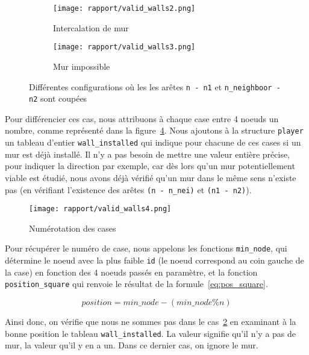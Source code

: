 \documentclass[a4paper]{article}
\begin{document}
\begin{figure}[ht]
    \centering
    \begin{subfigure}{.5\textwidth}
        \centering
        \texttt{[image: rapport/valid\_walls2.png]}
        \caption{Intercalation de mur}
        \label{fig:valid_walls2}
    \end{subfigure}%
    \begin{subfigure}{.5\textwidth}
        \centering
        \texttt{[image: rapport/valid\_walls3.png]}
        \caption{Mur impossible}
        \label{fig:valid_walls3}
    \end{subfigure}
    
    \caption{Différentes configurations où les les arêtes \texttt{n - n1} et \texttt{n\_neighboor - n2} sont coupées}
    \label{fig:valid_walls_trouble}
\end{figure}

Pour différencier ces cas, nous attribuons à chaque case entre 4 noeuds un nombre, comme représenté dans la figure~\ref{fig:valid_walls4}. Nous ajoutons à la structure \texttt{player} un tableau d'entier \texttt{wall\_installed} qui indique pour chacune de ces cases si un mur est déjà installé. Il n'y a pas besoin de mettre une valeur entière précise, pour indiquer la direction par exemple, car dès lors qu'un mur potentiellement viable est étudié, nous avons déjà vérifié qu'un mur dans le même sens n'existe pas (en vérifiant l'existence des arêtes \texttt{(n~-~n\_nei)} et \texttt{(n1~-~n2)}). \\


\begin{figure}[ht!]
    \centering
    \texttt{[image: rapport/valid\_walls4.png]}
    \caption{Numérotation des cases}
    \label{fig:valid_walls4}
\end{figure}

Pour récupérer le numéro de case, nous appelons les fonctions \texttt{min\_node}, qui détermine le noeud avec la plus faible \texttt{id} (le noeud correspond au coin gauche de la case) en fonction des 4 noeuds passés en paramètre, et la fonction \texttt{position\_square} qui renvoie le résultat de la formule~\eqref{eq:pos_square}.

\begin{equation}
    position = min\_node - (min\_node \% n) 
    \label{eq:pos_square}
\end{equation}

Ainsi donc, on vérifie que nous ne sommes pas dans le cas~\ref{fig:valid_walls3} en examinant à la bonne position le tableau \texttt{wall\_installed}. La valeur  signifie qu'il n'y a pas de mur, la valeur  qu'il y en a un. Dans ce dernier cas, on ignore le mur. \\
\end{document}
